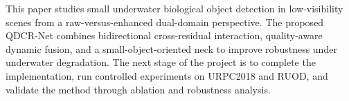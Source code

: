 This paper studies small underwater biological object detection in low-visibility scenes
from a raw-versus-enhanced dual-domain perspective. The proposed QDCR-Net combines
bidirectional cross-residual interaction, quality-aware dynamic fusion, and a
small-object-oriented neck to improve robustness under underwater degradation. The next
stage of the project is to complete the implementation, run controlled experiments on
URPC2018 and RUOD, and validate the method through ablation and robustness analysis.
